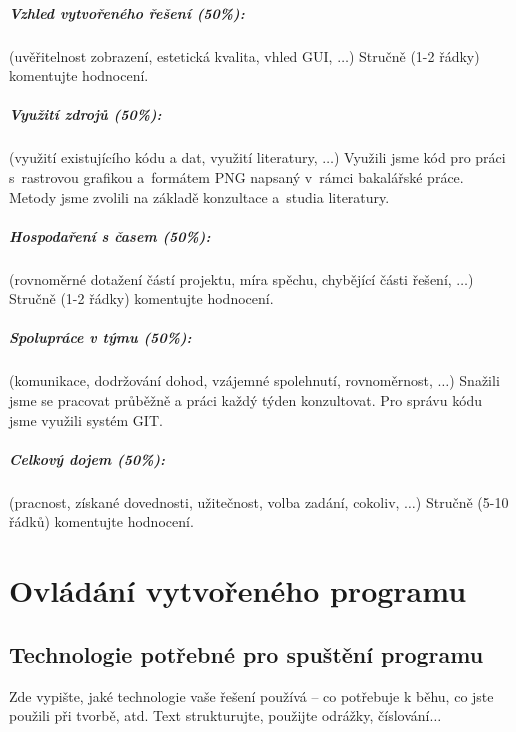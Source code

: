 \documentclass[12pt,a4paper,titlepage,final]{report}
\begin{document}
\paragraph{Vzhled vytvořeného řešení (50\%):} (uvěřitelnost zobrazení,
estetická kvalita, vhled GUI, $\ldots$)
Stručně (1-2 řádky) komentujte hodnocení.

\paragraph{Využití zdrojů (50\%):} (využití existujícího kódu a dat, využití
literatury, $\ldots$)
Využili jsme kód pro práci s~rastrovou grafikou a~formátem PNG napsaný v~rámci
bakalářské práce. Metody jsme zvolili na základě konzultace a~studia
literatury.

\paragraph{Hospodaření s časem (50\%):} (rovnoměrné dotažení částí projektu,
míra spěchu, chybějící části řešení, $\ldots$)
Stručně (1-2 řádky) komentujte hodnocení.

\paragraph{Spolupráce v týmu (50\%):} (komunikace, dodržování dohod, vzájemné
spolehnutí, rovnoměrnost, $\ldots$)
Snažili jsme se pracovat průběžně a práci každý týden konzultovat. Pro
správu kódu jsme využili systém GIT.

\paragraph{Celkový dojem (50\%):} (pracnost, získané dovednosti, užitečnost,
volba zadání, cokoliv, $\ldots$)
Stručně (5-10 řádků) komentujte hodnocení.

\chapter{Ovládání vytvořeného programu}

\section{Technologie potřebné pro spuštění programu}
Zde vypište, jaké technologie vaše řešení používá – co potřebuje k běhu, co
jste použili při tvorbě, atd. Text strukturujte, použijte odrážky,
číslování$\ldots$
\end{document}
